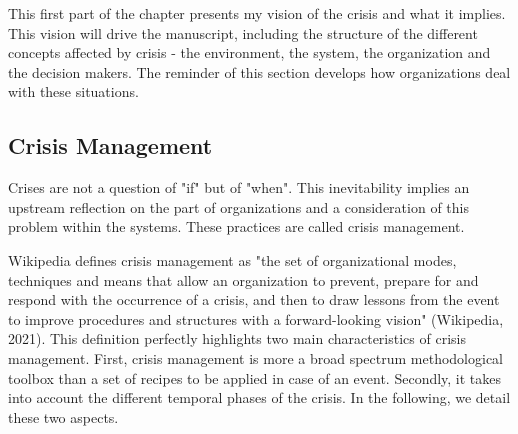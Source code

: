 This first part of the chapter presents my vision of the crisis and what it implies.
This vision will drive the manuscript, including the structure of the different concepts affected by crisis - the environment, the system, the organization and the decision makers.
The reminder of this section develops how organizations deal with these situations.

\subsection{Crisis Management}
Crises are not a question of "if" but of "when".
This inevitability implies an upstream reflection on the part of organizations and a consideration of this problem within the systems.
These practices are called crisis management.

Wikipedia defines crisis management as "the set of organizational modes, techniques and means that allow an organization to prevent,
prepare for and respond with the occurrence of a crisis, and then to draw lessons from the event to improve procedures and structures
with a forward-looking vision" (Wikipedia, 2021).
This definition perfectly highlights two main characteristics of crisis management.
First, crisis management is more a broad spectrum methodological toolbox than a set of recipes to be applied in case of an event.
Secondly, it takes into account the different temporal phases of the crisis.
In the following, we detail these two aspects.

